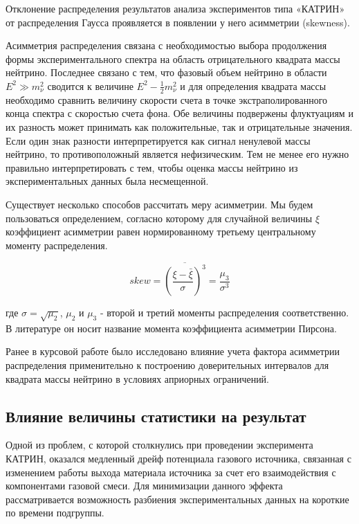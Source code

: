 \documentclass[a4paper,14pt]{extarticle}
\begin{document}
    Отклонение распределения результатов анализа экспериментов типа «КАТРИН» от распределения
    Гаусса проявляется в появлении у него асимметрии (skewness).
    
    Асимметрия распределения связана с необходимостью выбора продолжения формы экспериментального спектра
    на область отрицательного квадрата массы нейтрино. Последнее связано с тем, что фазовый объем нейтрино
    в области $E^2 \gg  m^2_\nu$ сводится к величине $E^2 - \frac{1}{2} m^2_\nu$ и для определения квадрата массы необходимо
    сравнить величину скорости счета в точке экстраполированного конца спектра с скоростью счета фона. Обе
    величины подвержены флуктуациям и их разность может принимать как положительные, так и отрицательные
    значения. Если один знак разности интерпретируется как сигнал ненулевой массы нейтрино, то
    противоположный является нефизическим. Тем не менее его нужно правильно интерпретировать с тем, чтобы
    оценка массы нейтрино из экспериментальных данных была несмещенной.
    
    Существует несколько способов рассчитать меру асимметрии. Мы будем пользоваться определением,
    согласно которому для случайной величины $\xi$ коэффициент асимметрии равен нормированному третьему 
    центральному моменту распределения.
    
    \begin{equation}
      skew = \overline{\left( \frac{\xi-\bar \xi}{\sigma} \right)^3} = \frac{\mu_3}{\sigma^3}
    \end{equation}
    
    \noindent где $\sigma = \sqrt{\mu_2}$, $\mu_2$ и $\mu_3$ - второй и третий моменты
    распределения соответственно. В литературе он носит название момента коэффициента асимметрии
    Пирсона.
    
    Ранее в курсовой работе \cite{zubrilin} было исследовано влияние учета фактора асимметрии распределения
    применительно к построению доверительных интервалов для квадрата массы нейтрино в условиях априорных
    ограничений. 
    
    \subsection{Влияние величины статистики на результат}
    
    
    Одной из проблем, с которой столкнулись при проведении эксперимента КАТРИН, оказался медленный дрейф
    потенциала газового источника, связанная с изменением работы выхода материала источника за счет
    его взаимодействия с компонентами газовой смеси. Для минимизации данного эффекта рассматривается
    возможность разбиения экспериментальных данных на короткие по времени подгруппы.
    
\end{document}
